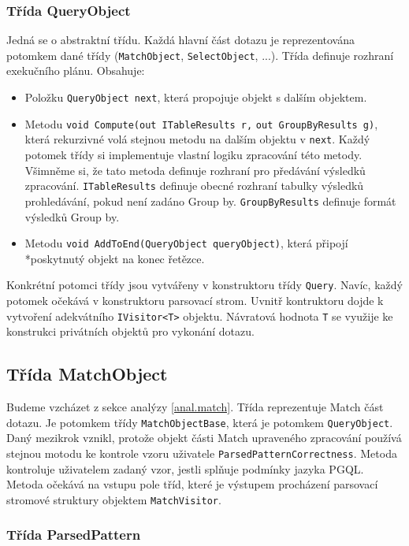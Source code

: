 \subsubsection{Třída QueryObject}

Jedná se o abstraktní třídu.
Každá hlavní část dotazu je reprezentována potomkem dané třídy (\texttt{MatchObject}, \texttt{SelectObject}, ...).
Třída definuje rozhraní exekučního plánu.
Obsahuje:
\begin{itemize}
\item Položku \texttt{QueryObject next}, která propojuje objekt s dalším objektem.
\item Metodu \texttt{void Compute(out ITableResults r,} \texttt{out GroupByResults g)}, která rekurzivné volá stejnou metodu na dalším objektu v \texttt{next}.
Každý potomek třídy si implementuje vlastní logiku zpracování této metody.
Všimněme si, že tato metoda definuje rozhraní pro předávání výsledků zpracování.
\texttt{ITableResults} definuje obecné rozhraní tabulky výsledků prohledávání, pokud není zadáno Group by.
\texttt{GroupByResults} definuje formát výsledků Group by.
\item Metodu \texttt{void AddToEnd(QueryObject queryObject)}, která připojí \\*poskytnutý objekt na konec řetězce.
\end{itemize}
Konkrétní potomci třídy jsou vytvářeny v konstruktoru třídy \texttt{Query}.
Navíc, každý potomek očekává v konstruktoru parsovací strom.
Uvnitř kontruktoru dojde k vytvoření adekvátního \texttt{IVisitor<T>} objektu.
Návratová hodnota \texttt{T} se využije ke konstrukci privátních objektů pro vykonání dotazu.

\subsection{Třída MatchObject}

Budeme vzcházet z sekce analýzy \ref{anal.match}.
Třída reprezentuje Match část dotazu.
Je potomkem třídy \texttt{MatchObjectBase}, která je potomkem \texttt{QueryObject}.
Daný mezikrok vznikl, protože objekt části Match upraveného zpracování používá stejnou motodu ke kontrole vzoru uživatele \texttt{ParsedPatternCorrectness}.
Metoda kontroluje uživatelem zadaný vzor, jestli splňuje podmínky jazyka PGQL. 
Metoda očekává na vstupu pole tříd, které je výstupem procházení parsovací stromové struktury objektem \texttt{MatchVisitor}. 

\subsubsection{Třída ParsedPattern}

